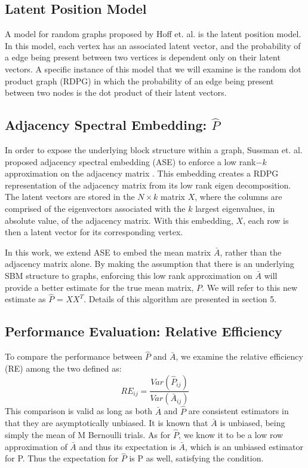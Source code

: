 \subsection{Latent Position Model}
A model for random graphs proposed by Hoff et. al. is the latent position model.  In this model, each vertex has an associated latent vector, and the probability of a edge being present between two vertices is dependent only on their latent vectors. \cite{Hoff}  A specific instance of this model that we will examine is the random dot product graph (RDPG) in which the probability of an edge being present between two nodes is the dot product of their latent vectors.\cite{Schein}

\subsection{Adjacency Spectral Embedding: $\hat{P}$}
In order to expose the underlying block structure within a graph, Sussman et. al. proposed adjacency spectral embedding (ASE) to enforce a low rank$-k$ approximation on the adjacency matrix \cite{Sussman2012}.  This embedding creates a RDPG representation of the adjacency matrix from its low rank eigen decomposition.  The latent vectors are stored in the $N \times k$ matrix $X$, where the columns are comprised of the eigenvectors associated with the $k$ largest eigenvalues, in absolute value, of the adjacency matrix.  With this embedding, $X$, each row is then a latent vector for its corresponding vertex.

In this work, we extend ASE to embed the mean matrix $\bar{A}$, rather than the adjacency matrix alone.  By making the assumption that there is an underlying SBM structure to graphs, enforcing this low rank approximation on $\bar{A}$ will provide a better estimate for the true mean matrix, $P$.  We will refer to this new estimate as $\hat{P}$ = $XX^T$.  Details of this algorithm are presented in section 5.
\subsection{Performance Evaluation: Relative Efficiency}
To compare the performance between $\hat{P}$ and $\bar{A}$, we examine the relative efficiency (RE) among the two defined as:
\begin{equation}
RE_{ij} = \frac{Var(\hat{P}_{ij})}{Var(\bar{A}_{ij})}
\end{equation}
This comparison is valid as long as both $\bar{A}$ and $\hat{P}$ are consistent estimators in that they are asymptotically unbiased.  It is known that $\bar{A}$ is unbiased, being simply the mean of M Bernoulli trials. As for $\hat{P}$, we know it to be a low row approximation of $\bar{A}$ and thus its expectation is $\bar{A}$, which is an unbiased estimator for P. Thus the expectation for $\hat{P}$ is P as well, satisfying the condition.